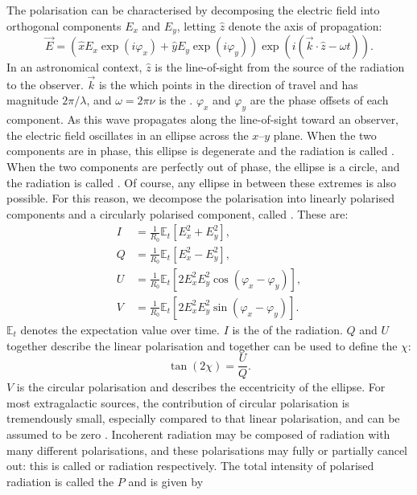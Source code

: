         The polarisation can be characterised by decomposing the electric field into orthogonal components $E_x$ and $E_y$, letting $\hat z$ denote the axis of propagation:
        \begin{equation}
            \vec E = (\hat x E_x \exp(i \varphi_x) + \hat y E_y \exp(i \varphi_y)) \exp(i (\vec k \cdot \hat z - \omega t)).
        \end{equation}
        In an astronomical context, $\hat z$ is the line-of-sight from the source of the radiation to the observer. $\vec k$ is the  which points in the direction of travel and has magnitude $2\pi/\lambda$, and $\omega = 2\pi\nu$ is the . $\varphi_x$ and $\varphi_y$ are the phase offsets of each component. As this wave propagates along the line-of-sight toward an observer, the electric field oscillates in an ellipse across the $x$--$y$ plane. When the two components are in phase, this ellipse is degenerate and the radiation is called . When the two components are perfectly out of phase, the ellipse is a circle, and the radiation is called . Of course, any ellipse in between these extremes is also possible. For this reason, we decompose the polarisation into linearly polarised components and a circularly polarised component, called  \citep{stokes_composition_1851,condon_essential_2016}. These are:
        \begin{align}
            \label{eq:stokes-i}
            I &= \frac{1}{R_0} \mathbb E_t[E_x^2 + E_y^2],\\
            \label{eq:stokes-q}
            Q &= \frac{1}{R_0} \mathbb E_t[E_x^2 - E_y^2],\\
            \label{eq:stokes-u}
            U &= \frac{1}{R_0} \mathbb E_t[2 E_x^2 E_y^2 \cos (\varphi_x - \varphi_y)],\\
            \label{eq:stokes-v}
            V &= \frac{1}{R_0} \mathbb E_t[2 E_x^2 E_y^2 \sin (\varphi_x - \varphi_y)].
        \end{align}
        $\mathbb E_t$ denotes the expectation value over time. $I$ is the  of the radiation. $Q$ and $U$ together describe the linear polarisation and together can be used to define the  $\chi$:
        \begin{equation}
            \label{eq:polarisation-angle}
            \tan (2 \chi) = \frac{U}{Q}.
        \end{equation}
        $V$ is the circular polarisation and describes the eccentricity of the ellipse. For most extragalactic sources, the contribution of circular polarisation is tremendously small, especially compared to that linear polarisation, and can be assumed to be zero \citep{rayner_radio_2000,saikia_polarization_1988}. Incoherent radiation may be composed of radiation with many different polarisations, and these polarisations may fully or partially cancel out: this is called  or  radiation respectively. The total intensity of polarised radiation is called the  $P$ and is given by

